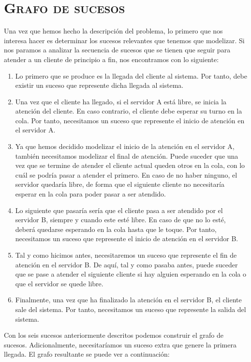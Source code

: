 \documentclass[11pt,a4paper]{article}
\begin{document}
\section{\textsc{Grafo de sucesos}}

Una vez que hemos hecho la descripción del problema, lo primero que nos interesa hacer es determinar
los sucesos relevantes que tenemos que modelizar. Si nos paramos a analizar la secuencia de sucesos
que se tienen que seguir para atender a un cliente de principio a fin, nos encontramos con lo siguiente:

\begin{enumerate}
	\item Lo primero que se produce es la llegada del cliente al sistema. Por tanto, debe existir
	un suceso que represente dicha llegada al sistema.
	\item Una vez que el cliente ha llegado, si el servidor A está libre, se inicia la atención
	del cliente. En caso contrario, el cliente debe esperar su turno en la cola. Por tanto, necesitamos
	un suceso que represente el inicio de atención en el servidor A.
	\item Ya que hemos decidido modelizar el inicio de la atención en el servidor A, también necesitamos
	modelizar el final de atención. Puede suceder que una vez que se termine de atender el cliente actual
	queden otros en la cola, con lo cuál se podría pasar a atender el primero. En caso de no haber ninguno,
	el servidor quedaría libre, de forma que el siguiente cliente no necesitaría esperar en la cola para poder
	pasar a ser atendido.
	\item Lo siguiente que pasaría sería que el cliente pasa a ser atendido por el servidor B, siempre
	y cuando este esté libre. En caso de que no lo esté, deberá quedarse esperando en la cola hasta
	que le toque. Por tanto, necesitamos un suceso que represente el inicio de atención en el servidor B.
	\item Tal y como hicimos antes, necesitaremos un suceso que represente el fin de atención en el
	servidor B. De aquí, tal y como pasaba antes, puede suceder que se pase a atender el siguiente cliente
	si hay alguien esperando en la cola o que el servidor se quede libre.
	\item Finalmente, una vez que ha finalizado la atención en el servidor B, el cliente sale del sistema.
	Por tanto, necesitamos un suceso que represente la salida del sistema.
\end{enumerate}

Con los seis sucesos anteriormente descritos podemos construir el grafo de sucesos. Adicionalmente,
necesitaríamos un suceso extra que genere la primera llegada. El grafo resultante se puede ver a continuación:
\end{document}
